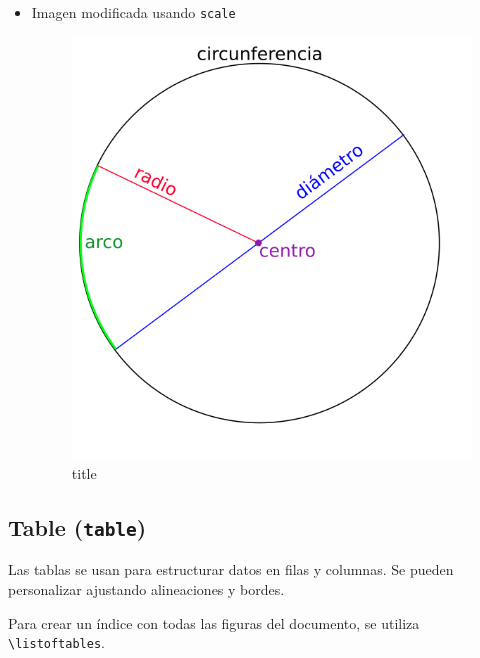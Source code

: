 \documentclass{book}
\begin{document}
\begin{itemize}
    \item Imagen modificada usando \texttt{scale}
    \begin{codigo}
    \begin{LTXexample}[numbers=none]
        \begin{figure}[htp]
          \centering
          \includegraphics[scale=0.2]{imagen-ejemplo}
          \caption[loftitle]{title}
          \label{etiqueta}              
        \end{figure}
    \end{LTXexample}
    \label{ejemplo:figure_escala}
    \end{codigo}

\end{itemize}

\subsection{Table (\texttt{table})}\label{table}
Las tablas se usan para estructurar datos en filas y columnas. Se pueden personalizar ajustando alineaciones y bordes.

Para crear un índice con todas las figuras del documento, se utiliza \verb|\listoftables|.\\
\end{document}
